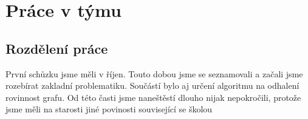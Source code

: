 \section{Práce v týmu}

\subsection{Rozdělení práce}
První schůzku jsme měli v říjen.
Touto dobou jsme se seznamovali a začali jsme rozebírat zakladní problematiku. Součástí bylo aj určení algoritmu
na odhalení rovinnost grafu.
Od této časti jsme naneštěstí dlouho nijak nepokročili, protože jsme měli na starosti jiné povinosti související se školou

